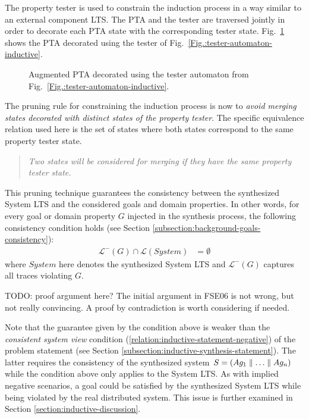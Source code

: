 The property tester is used to constrain the induction process in a way similar to an external component LTS. The PTA and the tester are traversed jointly in order to decorate each PTA state with the corresponding tester state. Fig.~\ref{Fig.:goal-unfolded-pta} shows the PTA decorated using the tester of Fig.~\ref{Fig.:tester-automaton-inductive}.

\begin{figure}
\centering
{}
\caption{Augmented PTA decorated using the tester automaton from Fig.~\ref{Fig.:tester-automaton-inductive}\label{Fig.:goal-unfolded-pta}.}
\end{figure}

The pruning rule for constraining the induction process is now to \emph{avoid merging states decorated with distinct states of the property tester}. The specific equivalence relation used here is the set of states where both states correspond to the same property tester state. 
\begin{quote}
\emph{Two states will be considered for merging if they have the same property tester state.}
\end{quote}

This pruning technique guarantees the consistency between the synthesized System LTS and the considered goals and domain properties. In other words, for every goal or domain property $G$ injected in the synthesis process, the following consistency condition holds (see Section \ref{subsection:background-goals-consistency}):
\begin{align*}
\mathcal{L}^-(G) \cap \mathcal{L}(System) &= \emptyset
\end{align*}
\noindent where $System$ here denotes the synthesized System LTS and $\mathcal{L}^-(G)$ captures all traces violating $G$.

TODO: proof argument here? The initial argument in FSE06 is not wrong, but not really convincing. A proof by contradiction is worth considering if needed. 

Note that the guarantee given by the condition above is weaker than the \emph{consistent system view} condition (\ref{relation:inductive-statement-negative}) of the problem statement (see Section \ref{subsection:inductive-synthesis-statement}). The latter requires the consistency of the synthesized system $S = (Ag_1 \parallel \ldots \parallel Ag_n)$ while the condition above only applies to the System LTS. As with implied negative scenarios, a goal could be satisfied by the synthesized System LTS while being violated by the real distributed system. This issue is further examined in Section \ref{section:inductive-discussion}.
